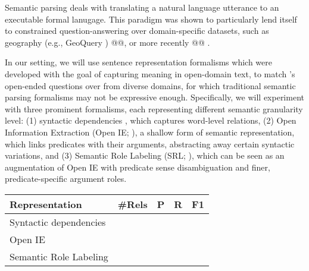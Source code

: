 
Semantic parsing \cite{semantic-parsing}
deals with translating a natural language utterance to
an executable formal lanugage.
This paradigm was shown to particularly lend itself to constrained question-answering
over domain-specific datasets, such as geography (e.g., GeoQuery \cite{geoquery})
@@, or more recently @@ .

In our setting, we will use sentence representation formalisms which were
developed with the goal of capturing meaning in open-domain text, to match \drop's
open-ended questions over from diverse domains,
for which traditional semantic parsing formalisms may not be expressive enough.
Specifically, we will experiment with three prominent formalisms, each
representing different semantic granularity level:
(1) syntactic dependencies \cite{sd}, which captures word-level relations, 
(2) Open Information Extraction (Open IE; \cite{oie}), a shallow
form of semantic representation, which links predicates
with their arguments, abstracting away certain syntactic variations, and
(3) Semantic Role Labeling (SRL; \cite{srl}), which can be seen as an
augmentation of Open IE with predicate sense disambiguation and finer, predicate-specific
argument roles.


\begin{table}[]
\begin{tabular}{@{}lllll@{}}
\toprule
Representation         & \#Rels & P & R & F1 \\ \midrule
Syntactic dependencies &             &           &        &    \\
Open IE                &             &           &        &    \\
Semantic Role Labeling  &             &           &        &    \\ \bottomrule
\end{tabular}
\end{table}

